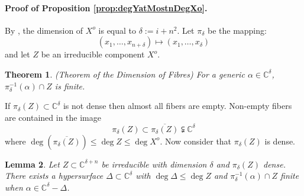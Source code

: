 \documentclass[12pt]{article}
\def\C{\mathbb{C}}
\newtheorem{theorem}{Theorem}[section]
\newtheorem{lemma}[theorem]{Lemma}
\def\C{\mathbb{C}}
\begin{document}
\paragraph*{Proof of Proposition \ref{prop:degYatMostnDegXo}.}
By \cite[Section D.2]{TWT}, the dimension of $X^o$ is equal to $\delta := i + n^2$. Let $\pi_\delta$ be the mapping: \[(x_1,\hdots,x_{n+\delta}) \mapsto (x_1,\hdots,x_\delta)\] and let $Z$ be an irreducible component $X^o$. 
%
\begin{theorem} (Theorem of the Dimension of Fibres\cite[Chapter 1.6.3]{Shafarevich77})
For a generic $\alpha \in \C^{\delta}$, $\pi_{\delta}^{-1}(\alpha) \cap Z$ is finite. 
\end{theorem} 
%
\noindent 
If $\pi_\delta(Z) \subset \C^{\delta}$ is not dense then almost all fibers are empty. Non-empty fibers are contained in the image \[\pi_{\delta}(Z) \subset \overline{\pi_{\delta}(Z)} \subsetneqq \C^{\delta}\] where $\deg \left( \overline{\pi_{\delta}(Z)} \right) \leq \deg Z \leq \deg X^o.$ Now consider that $\pi_\delta(Z)$ is dense.
%
\begin{lemma}
Let $Z \subset \C^{\delta + n}$ be irreducible with dimension $\delta$ and $\pi_\delta(Z)$ dense. There exists a hypersurface $\Delta \subset \C^{\delta}$ with $\deg \Delta \leq \deg Z$ and $\pi_\delta^{-1}(\alpha) \cap Z$ finite when $\alpha \in \C^\delta-\Delta$. 
\end{lemma}
%
\end{document}
